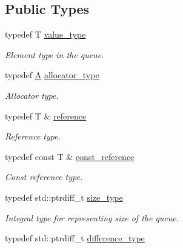 \subsection*{Public Types}
\begin{DoxyCompactItemize}
\item 
\hypertarget{classtbb_1_1concurrent__bounded__queue_a6eb564625fef03dd9a5881d5d4e52f9f}{}typedef T \hyperlink{classtbb_1_1concurrent__bounded__queue_a6eb564625fef03dd9a5881d5d4e52f9f}{value\+\_\+type}\label{classtbb_1_1concurrent__bounded__queue_a6eb564625fef03dd9a5881d5d4e52f9f}

\begin{DoxyCompactList}\small\item\em Element type in the queue. \end{DoxyCompactList}\item 
\hypertarget{classtbb_1_1concurrent__bounded__queue_acbfceb845de1c770e2b56409f09b0364}{}typedef \hyperlink{structA}{A} \hyperlink{classtbb_1_1concurrent__bounded__queue_acbfceb845de1c770e2b56409f09b0364}{allocator\+\_\+type}\label{classtbb_1_1concurrent__bounded__queue_acbfceb845de1c770e2b56409f09b0364}

\begin{DoxyCompactList}\small\item\em Allocator type. \end{DoxyCompactList}\item 
\hypertarget{classtbb_1_1concurrent__bounded__queue_a5fa4002bcd265d9d3ed305e3b686f1da}{}typedef T \& \hyperlink{classtbb_1_1concurrent__bounded__queue_a5fa4002bcd265d9d3ed305e3b686f1da}{reference}\label{classtbb_1_1concurrent__bounded__queue_a5fa4002bcd265d9d3ed305e3b686f1da}

\begin{DoxyCompactList}\small\item\em Reference type. \end{DoxyCompactList}\item 
\hypertarget{classtbb_1_1concurrent__bounded__queue_af838e520ce0db2c22369748c019b11cb}{}typedef const T \& \hyperlink{classtbb_1_1concurrent__bounded__queue_af838e520ce0db2c22369748c019b11cb}{const\+\_\+reference}\label{classtbb_1_1concurrent__bounded__queue_af838e520ce0db2c22369748c019b11cb}

\begin{DoxyCompactList}\small\item\em Const reference type. \end{DoxyCompactList}\item 
typedef std\+::ptrdiff\+\_\+t \hyperlink{classtbb_1_1concurrent__bounded__queue_ae73fa352d781bdb9d01bfb77f2a8bc28}{size\+\_\+type}
\begin{DoxyCompactList}\small\item\em Integral type for representing size of the queue. \end{DoxyCompactList}\item 
\hypertarget{classtbb_1_1concurrent__bounded__queue_a72725361e050c5a981035a20ef1b773e}{}typedef std\+::ptrdiff\+\_\+t \hyperlink{classtbb_1_1concurrent__bounded__queue_a72725361e050c5a981035a20ef1b773e}{difference\+\_\+type}\label{classtbb_1_1concurrent__bounded__queue_a72725361e050c5a981035a20ef1b773e}


\end{DoxyCompactItemize}
